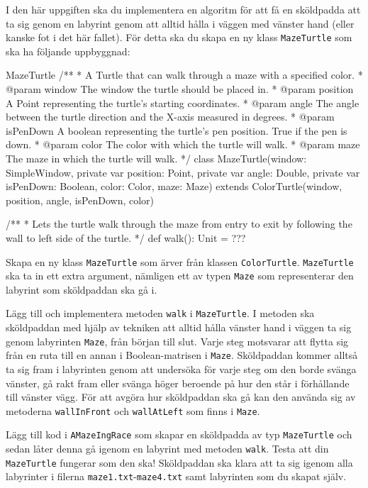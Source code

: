 \Task I den här uppgiften ska du implementera en algoritm för att få en sköldpadda att ta sig genom en labyrint genom att alltid hålla i väggen med vänster hand (eller kanske fot i det här fallet). För detta ska du skapa en ny klass \texttt{MazeTurtle} som ska ha följande uppbyggnad:


\begin{ScalaSpec}{MazeTurtle}
/**
 * A Turtle that can walk through a maze with a specified color.
 * @param window     The window the turtle should be placed in.
 * @param position   A Point representing the turtle's starting coordinates.
 * @param angle      The angle between the turtle direction and the X-axis 
 measured in degrees.
 * @param isPenDown  A boolean representing the turtle's pen position. 
 True if the pen is down.
 * @param color		   The color with which the turtle will walk.
 * @param maze	     The maze in which the turtle will walk.
 */
class MazeTurtle(window: SimpleWindow, private var position: Point, 
private var angle: Double, private var isPenDown: Boolean, 
color: Color, maze: Maze) extends ColorTurtle(window, position, angle, 
isPenDown, color) {

  /**
   * Lets the turtle walk through the maze from entry to exit by 
   following the wall to left side of the turtle.
   */
  def walk(): Unit = ???
}

\end{ScalaSpec}

\Subtask Skapa en ny klass \texttt{MazeTurtle} som ärver från klassen \texttt{ColorTurtle}. \texttt{MazeTurtle} ska ta in ett extra argument, nämligen ett av typen \texttt{Maze} som representerar den labyrint som sköldpaddan ska gå i.

\Subtask Lägg till och implementera metoden \texttt{walk} i \texttt{MazeTurtle}. I metoden ska sköldpaddan med hjälp av tekniken att alltid hålla vänster hand i väggen ta sig genom labyrinten \texttt{Maze}, från början till slut. Varje steg motsvarar att flytta sig från en ruta till en annan i Boolean-matrisen i \texttt{Maze}. Sköldpaddan kommer alltså ta sig fram i labyrinten genom att undersöka för varje steg om den borde svänga vänster, gå rakt fram eller svänga höger beroende på hur den står i förhållande till vänster vägg. För att avgöra hur sköldpaddan ska gå kan den använda sig av metoderna \texttt{wallInFront} och \texttt{wallAtLeft} som finns i \texttt{Maze}.

\Subtask Lägg till kod i \texttt{AMazeIngRace} som skapar en sköldpadda av typ \texttt{MazeTurtle} och sedan låter denna gå igenom en labyrint med metoden \texttt{walk}. Testa att din \texttt{MazeTurtle} fungerar som den ska! Sköldpaddan ska klara att ta sig igenom alla labyrinter i filerna \texttt{maze1.txt}-\texttt{maze4.txt} samt labyrinten som du skapat själv.


